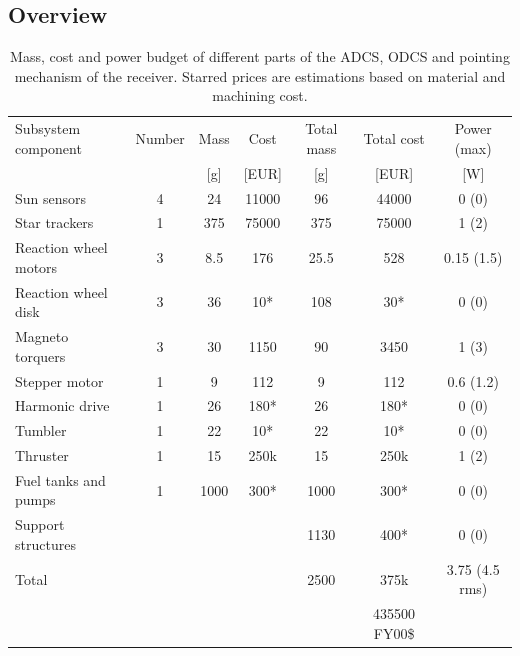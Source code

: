 \subsection{Overview}
\label{ss:recDDoverview}

\begin{table}[h]
\begin{tabular}{l | c | c c | c c | c }
Subsystem component    & Number & Mass & Cost & Total mass & Total cost & Power (max)\\ 
                       &   & [g] & [EUR]& [g]  &[EUR] & [W]         \\ \hline \hline
Sun sensors            & 4 & 24  & 11000& 96   & 44000&  0 (0)      \\
Star trackers          & 1 & 375 & 75000& 375  & 75000&  1 (2)      \\ \hline
Reaction wheel motors  & 3 & 8.5 & 176  & 25.5 & 528  &  0.15 (1.5) \\
Reaction wheel disk    & 3 & 36  & 10*  & 108  & 30*  &  0 (0)      \\
Magneto torquers       & 3 & 30  & 1150 & 90   & 3450 &  1 (3)      \\ \hline
Stepper motor          & 1 & 9   & 112  & 9    & 112  &  0.6 (1.2)  \\
Harmonic drive         & 1 & 26  & 180* & 26   & 180* &  0 (0)      \\ 
Tumbler                & 1 & 22  & 10*  & 22   & 10*  &  0 (0)      \\ \hline
Thruster			   & 1 & 15  & 250k & 15   & 250k &  1 (2)      \\
Fuel tanks and pumps   & 1 & 1000 & 300*& 1000  & 300*  & 0 (0)      \\ \hline
Support structures     &	&	 &	    & 1130  & 400* & 0 (0) \\
Total & & &                             & 2500  & 375k & 3.75 (4.5 rms) \\
&&&&& 435500 FY00\$ &
\end{tabular}
\caption[Mass, cost and power budget of AODCS and pointing mechanism receiver]{Mass, cost and power budget of different parts of the \ac{ADCS}, \ac{ODCS} and pointing mechanism of the receiver. Starred prices are estimations based on material and machining cost.}
\label{tab:adcspointbudget}
\end{table}